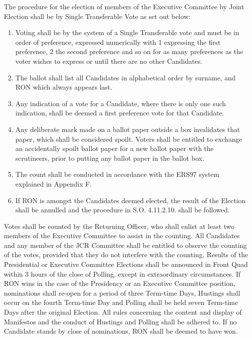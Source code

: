 \npara The procedure for the election of members of the Executive Committee by Joint Election shall be by Single Transferable Vote as set out below:
\begin{enumerate}
\item Voting shall be by the system of a Single Transferable vote and must be in order of preference, expressed numerically with 1 expressing the first preference, 2 the second preference and so on for as many preferences as the voter wishes to express or until there are no other Candidates.
\item The ballot shall list all Candidates in alphabetical order by surname, and RON which always appears last.
\item Any indication of a vote for a Candidate, where there is only one such indication, shall be deemed a first preference vote for that Candidate.
\item Any deliberate mark made on a ballot paper outside a box invalidates that paper, which shall be considered spoilt.
Voters shall be entitled to exchange an accidentally spoilt ballot paper for a new ballot paper with the scrutineers, prior to putting any ballot paper in the ballot box.
\item The count shall be conducted in accordance with the ERS97 system explained in Appendix F.
\item If RON is amongst the Candidates deemed elected, the result of the Election shall be annulled and the procedure in S.O. 4.11.2.10. shall be followed.
\end{enumerate}
\npara Votes shall be counted by the Returning Officer, who shall enlist at least two members of the Executive Committee to assist in the counting.
\npara All Candidates and any member of the JCR Committee shall be entitled to observe the counting of the votes, provided that they do not interfere with the counting.
\npara Results of the Presidential or Executive Committee Elections shall be announced in Front Quad within 3 hours of the close of Polling, except in extraordinary circumstances.
\npara If RON wins in the case of the Presidency or an Executive Committee position, nominations shall re-open for a period of three Term-time Days, Hustings shall occur on the fourth Term-time Day and Polling shall be held seven Term-time Days after the original Election. All rules concerning the content and display of Manifestos and the conduct of Hustings and Polling shall be adhered to.
\npara If no Candidate stands by close of nominations, RON shall be deemed to have won.
